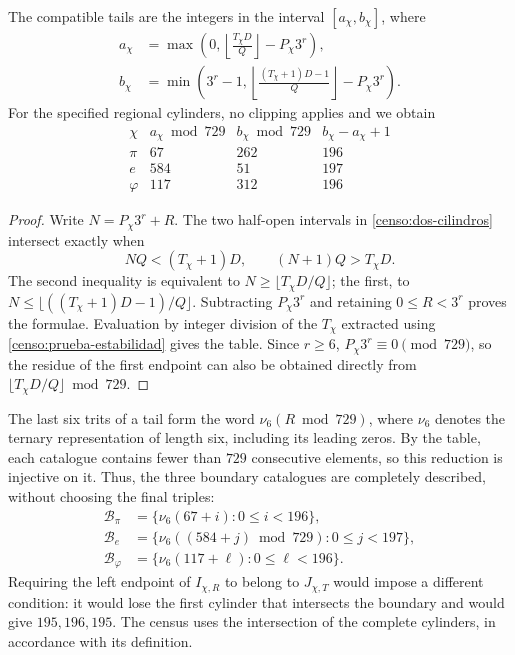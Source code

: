 \begin{proposition}
\label{censo:catalogos}
The compatible tails are the integers in the interval \([a_\chi,b_\chi]\),
where
\begin{align}
 a_\chi&=\max\left(0,
       \left\lfloor\frac{T_\chi D}{Q}\right\rfloor-P_\chi3^r\right),
       \label{censo:extremo-a}\\
 b_\chi&=\min\left(3^r-1,
       \left\lfloor\frac{(T_\chi+1)D-1}{Q}\right\rfloor-P_\chi3^r\right).
       \label{censo:extremo-b}
\end{align}
For the specified regional cylinders, no clipping applies and we obtain
\begin{equation}
\begin{array}{c|r|r|r}
 \chi&a_\chi\bmod729&b_\chi\bmod729&b_\chi-a_\chi+1\\\hline
 \pi&67&262&196\\
 e&584&51&197\\
 \varphi&117&312&196
\end{array}
\label{censo:tabla-catalogos}
\end{equation}
\end{proposition}
\begin{proof}
Write \(N=P_\chi3^r+R\). The two half-open intervals in
\eqref{censo:dos-cilindros} intersect exactly when
\[
 NQ<(T_\chi+1)D,\qquad (N+1)Q>T_\chi D.
\]
The second inequality is equivalent to
\(N\geq\lfloor T_\chi D/Q\rfloor\); the first, to
\(N\leq\lfloor((T_\chi+1)D-1)/Q\rfloor\). Subtracting
\(P_\chi3^r\) and retaining \(0\leq R<3^r\) proves the formulae.
Evaluation by integer division of the \(T_\chi\) extracted using
\eqref{censo:prueba-estabilidad} gives the table. Since \(r\geq6\),
\(P_\chi3^r\equiv0\pmod{729}\), so the residue of the first
endpoint can also be obtained directly from
\(\lfloor T_\chi D/Q\rfloor\bmod729\).
\end{proof}

The last six trits of a tail form the word
\(\nu_6(R\bmod729)\), where \(\nu_6\) denotes the ternary representation
of length six, including its leading zeros. By the table, each
catalogue contains fewer than \(729\) consecutive elements, so
this reduction is injective on it. Thus, the three boundary catalogues
are completely described, without choosing the final triples:
\begin{equation}
 \begin{split}
 \mathcal B_\pi&=\{\nu_6(67+i):0\leq i<196\},\\
 \mathcal B_e&=\{\nu_6((584+j)\bmod729):0\leq j<197\},\\
 \mathcal B_\varphi&=\{\nu_6(117+\ell):0\leq\ell<196\}.
 \end{split}
 \label{censo:fronteras-explicitas}
\end{equation}
Requiring the left endpoint of \(I_{\chi,R}\) to belong to
\(J_{\chi,T}\) would impose a different condition: it would lose the first cylinder
that intersects the boundary and would give \(195,196,195\). The census uses the
intersection of the complete cylinders, in accordance with its definition.

